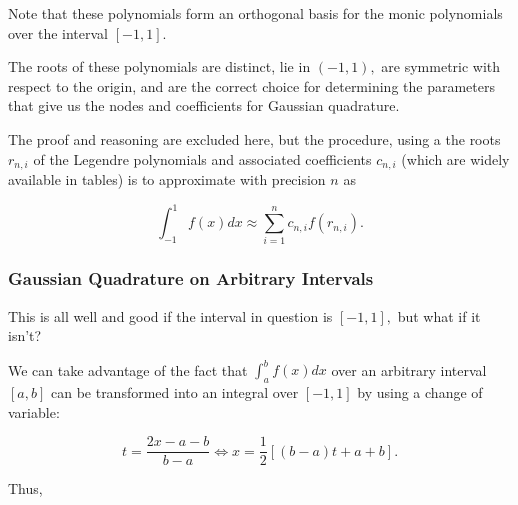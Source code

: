 \documentclass{article}
\begin{document}
Note that these polynomials form an \@{orthogonal} basis for the monic polynomials over the interval $[-1, 1].$

The roots of these polynomials are distinct, lie in $(-1, 1),$ are symmetric with respect to the origin, and are the correct choice for determining the parameters that give us the nodes and coefficients for Gaussian quadrature.

The proof and reasoning are excluded here, but the procedure, using a the roots $r_{n,i}$ of the Legendre polynomials and associated coefficients $c_{n,i}$ (which are widely available in tables) is to approximate with precision $n$ as 

\[ \int_{-1}^{1} f(x) dx \approx \sum_{i=1}^n c_{n, i} f(r_{n, i}). \]

\subsubsection{Gaussian Quadrature on Arbitrary Intervals}

This is all well and good if the interval in question is $[-1, 1],$ but what if it isn't?

We can take advantage of the fact that $\int_{a}^{b}f(x) dx$ over an arbitrary interval $[a,b]$ can be transformed into an integral over $[-1, 1]$ by using a change of variable:

\[ t = \frac{2x - a - b}{b - a} \iff x = \frac{1}{2}[(b - a)t + a + b]. \]

Thus,
\end{document}
